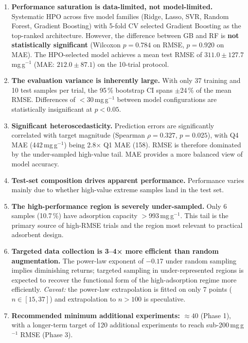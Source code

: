 \documentclass[12pt,a4paper]{article}
\begin{document}
\begin{enumerate}[leftmargin=*]

  \item \textbf{Performance saturation is data-limited, not
        model-limited.}  Systematic HPO across five model families
        (Ridge, Lasso, SVR, Random Forest, Gradient Boosting) with
        5-fold CV selected Gradient Boosting as the top-ranked architecture.
        However, the difference between GB and RF is \textbf{not
        statistically significant} (Wilcoxon $p = 0.784$ on RMSE,
        $p = 0.920$ on MAE).  The HPO-selected model achieves a mean test
        RMSE of $311.0 \pm 127.7$\,mg\,g$^{-1}$ (MAE: $212.0 \pm 87.1$)
        on the 10-trial protocol.

  \item \textbf{The evaluation variance is inherently large.}  With only
        37 training and 10 test samples per trial, the 95\,\% bootstrap
        CI spans $\pm$24\,\% of the mean RMSE.  Differences of
        $<$30\,mg\,g$^{-1}$ between model configurations are
        statistically insignificant at $p < 0.05$.

  \item \textbf{Significant heteroscedasticity.}  Prediction errors are
        significantly correlated with target magnitude (Spearman $\rho =
        0.327$, $p = 0.025$), with Q4 MAE (442\,mg\,g$^{-1}$) being
        2.8$\times$ Q1 MAE (158).  RMSE is therefore dominated by the
        under-sampled high-value tail.  MAE provides a more balanced
        view of model accuracy.

  \item \textbf{Test-set composition drives apparent performance.}
        Performance varies mainly due to
        whether high-value extreme samples land in the test set.

  \item \textbf{The high-performance region is severely under-sampled.}
        Only 6 samples (10.7\,\%) have adsorption capacity
        $>$993\,mg\,g$^{-1}$.  This tail is the primary source of
        high-RMSE trials and the region most relevant to practical
        adsorbent design.

  \item \textbf{Targeted data collection is 3--4× more efficient than
        random augmentation.}  The power-law exponent of $-0.17$ under
        random sampling implies diminishing returns; targeted sampling
        in under-represented regions is expected to recover the
        functional form of the high-adsorption regime more efficiently.
        \emph{Caveat:} the power-law extrapolation is fitted on only 7
        points ($n \in [15, 37]$) and extrapolation to $n > 100$ is
        speculative.

  \item \textbf{Recommended minimum additional experiments: $\approx 40$}
        (Phase 1), with a longer-term target of 120 additional experiments
        to reach sub-200\,mg\,g$^{-1}$ RMSE (Phase 3).

\end{enumerate}
\end{document}
